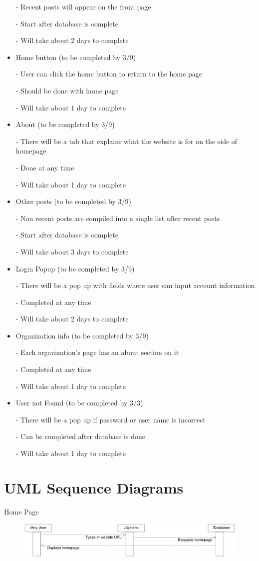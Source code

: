 \documentclass[12pt]{article}
\begin{document}
\begin{itemize}
	- Recent posts will appear on the front page

	- Start after database is complete

	- Will take about 2 days to complete
\item
	Home button (to be completed by 3/9)

	- User can click the home button to return to the home page

	- Should be done with home page

	- Will take about 1 day to complete
\item
	About (to be completed by 3/9)

	- There will be a tab that explains what the website is for on the side of homepage

	- Done at any time

	- Will take about 1 day to complete
\item
	Other posts (to be completed by 3/9)

	- Non recent posts are compiled into a single list after recent posts

	- Start after database is complete

	- Will take about 3 days to complete
\item
	Login Popup (to be completed by 3/9)

	- There will be a pop up with fields where user can input account information

	- Completed at any time

	- Will take about 2 days to complete
\item
	Organization info (to be completed by 3/9)

	- Each organization's page has an about section on it

	- Completed at any time

	- Will take about 1 day to complete
\item
	User not Found (to be completed by 3/3)

	- There will be a pop up if password or user name is incorrect

	- Can be completed after database is done

	- Will take about 1 day to complete
\end{itemize}
\section{UML Sequence Diagrams}
Home Page
\begin{figure}[h!]
\includegraphics[width=\textwidth]{homepage}
\end{figure}
\end{document}
